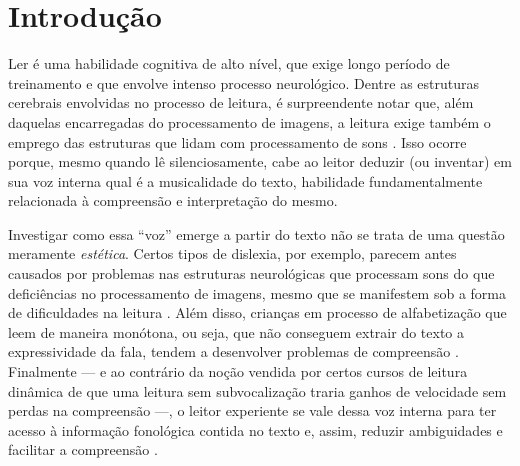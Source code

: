 \documentclass[a4paper,11pt,titlepage,singlespacing]{article}
\begin{document}



\section{Introdução}
\label{Sec:introducao}

Ler é uma habilidade cognitiva de alto nível, que exige longo período de treinamento e que envolve intenso processo neurológico. Dentre as estruturas cerebrais envolvidas no processo de leitura, é surpreendente notar que, além daquelas encarregadas do processamento de imagens, a leitura exige também o emprego das estruturas que lidam com processamento de sons \cite[cap.7]{seidenberg2017}. Isso ocorre porque, mesmo quando lê silenciosamente, cabe ao leitor deduzir (ou inventar) em sua voz interna qual é a musicalidade do texto, habilidade fundamentalmente relacionada à compreensão e interpretação do mesmo.

Investigar como essa ``voz'' emerge a partir do texto não se trata de uma questão meramente \textit{estética}. Certos tipos de dislexia, por exemplo, parecem antes causados por problemas nas estruturas neurológicas que processam sons do que deficiências no processamento de imagens, mesmo que se manifestem sob a forma de dificuldades na  leitura \cite[cap.8]{seidenberg2017}. Além disso, crianças em processo de alfabetização que leem de maneira monótona, ou seja, que não conseguem extrair do texto a expressividade da fala, tendem a desenvolver problemas de compreensão \cite{bessemans2017}. Finalmente — e ao contrário da noção vendida por certos cursos de leitura dinâmica de que uma leitura sem subvocalização traria ganhos de velocidade sem perdas na compreensão —, o leitor experiente se vale dessa voz interna para ter acesso à informação fonológica contida no texto e, assim, reduzir ambiguidades e facilitar a compreensão \cite[cap.4]{seidenberg2017}.

\end{document}
